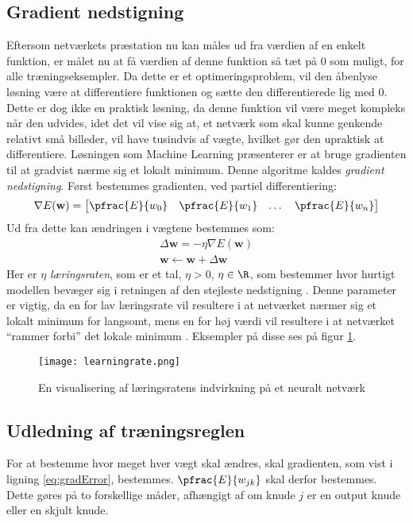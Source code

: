 \documentclass[../SOP.tex]{subfile}
\begin{document}
\subsection{Gradient nedstigning}
Eftersom netværkets præstation nu kan måles ud fra værdien af en enkelt funktion, er målet nu at få værdien af denne funktion så tæt på 0 som muligt, for alle træningseksempler. Da dette er et optimeringsproblem, vil den åbenlyse løsning være at differentiere funktionen og sætte den differentierede lig med 0. Dette er dog ikke en praktisk løsning, da denne funktion vil være meget kompleks når den udvides, idet det vil vise sig at, et netværk som skal kunne genkende relativt små billeder, vil have tusindvis af vægte, hvilket gør den upraktisk at differentiere. Løsningen som Machine Learning præsenterer er at bruge gradienten til at gradvist nærme sig et lokalt minimum. Denne algoritme kaldes \emph{gradient nedstigning}. Først bestemmes gradienten, ved partiel differentiering:
\begin{equation}
  \nabla E(\mathbf{w})=\begin{bmatrix}
    \pfrac{E}{w_0} & \pfrac{E}{w_1} & \dots & \pfrac{E}{w_n}
  \end{bmatrix}
  \label{eq:gradError}
\end{equation}
Ud fra dette kan ændringen i vægtene bestemmes som:
\begin{gather}
  \Delta \mathbf{w} = -\eta \nabla E(\mathbf{w}) \label{eq:trgrad}\\ 
  \mathbf{w} \leftarrow \mathbf{w} + \Delta\mathbf{w}
\end{gather}
Her er $\eta$ \emph{læringsraten}, som er et tal, $\eta>0$, $\eta\in\R$, som bestemmer hvor hurtigt modellen bevæger sig i retningen af den stejleste nedstigning \parencite{mitch}. Denne parameter er vigtig, da en for lav læringsrate vil resultere i at netværket nærmer sig et lokalt minimum for langsomt, mens en for høj værdi vil resultere i at netværket ``rammer forbi'' det lokale minimum \parencite{learningrate}. Eksempler på disse ses på figur \ref{fig:learningrate}.
\begin{figure}[ht]
  \centering
  \texttt{[image: learningrate.png]}
  \caption{En visualisering af læringsratens indvirkning på et neuralt netværk \parencite{learningrate}}
  \label{fig:learningrate}
\end{figure}

\subsection{Udledning af træningsreglen}
For at bestemme hvor meget hver vægt skal ændres, skal gradienten, som vist i ligning \ref{eq:gradError}, bestemmes. $\pfrac{E}{w_{jk}}$ skal derfor bestemmes. Dette gøres på to forskellige måder, afhængigt af om knude $j$ er en output knude eller en skjult knude.
\end{document}
